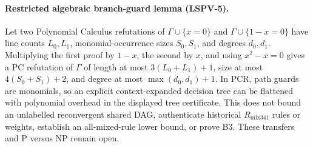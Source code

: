 \paragraph{Restricted algebraic branch-guard lemma (LSPV-5).}
Let two Polynomial Calculus refutations of $\Gamma\cup\{x=0\}$ and
$\Gamma\cup\{1-x=0\}$ have line counts $L_0,L_1$, monomial-occurrence
sizes $S_0,S_1$, and degrees $d_0,d_1$.  Multiplying the first proof by
$1-x$, the second by $x$, and using $x^2-x=0$ gives a PC refutation of
$\Gamma$ of length at most $3(L_0+L_1)+1$, size at most
$4(S_0+S_1)+2$, and degree at most $\max(d_0,d_1)+1$.  In PCR, path
guards are monomials, so an explicit context-expanded decision tree can
be flattened with polynomial overhead in the displayed tree certificate.
This does not bound an unlabelled reconvergent shared DAG, authenticate
historical $R_{\mathrm{mix341}}$ rules or weights, establish an all-mixed-rule
lower bound, or prove B3.  These transfers and P versus NP remain open.
